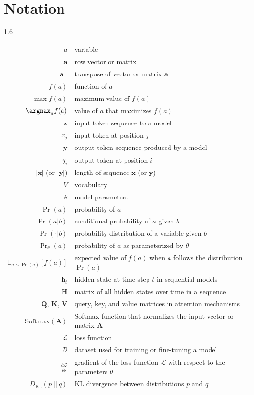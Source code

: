\chapter*{Notation}

\vspace{1.5em}

\begin{spacing}{1.6}
\begin{center}
\begin{tabular}{r l}
$a$ & variable \\
$\mathbf{a}$ & row vector or matrix \\
$\mathbf{a}^\top$ & transpose of vector or matrix $\mathbf{a}$ \\
$f(a)$ & function of $a$ \\
$\max f(a)$ & maximum value of $f(a)$ \\
$\argmax_{a} f(a)$ & value of $a$ that maximizes $f(a)$ \\
$\mathbf{x}$ & input token sequence to a model \\
$x_j$ & input token at position $j$ \\
$\mathbf{y}$ & output token sequence produced by a model \\
$y_i$ & output token at position $i$ \\
$|\mathbf{x}|$ (or $|\mathbf{y}|$) & length of sequence $\mathbf{x}$ (or $\mathbf{y}$)  \\
$V$ & vocabulary \\
$\theta$ & model parameters \\
$\Pr(a)$ & probability of $a$ \\
$\Pr(a|b)$ & conditional probability of $a$ given $b$ \\
$\Pr(\cdot|b)$ & probability distribution of a variable given $b$ \\
$\Pr_{\theta}(a)$ &  probability of $a$ as parameterized by $\theta$ \\
$\mathbb{E}_{a\sim \Pr(a)}[f(a)]$ & expected value of $f(a)$ when $a$ follows the distribution $\Pr(a)$ \\
$\mathbf{h}_t$ & hidden state at time step $t$ in sequential models \\
$\mathbf{H}$ & matrix of all hidden states over time in a sequence \\
$\mathbf{Q}$, $\mathbf{K}$, $\mathbf{V}$ & query, key, and value matrices in attention mechanisms \\
$\mathrm{Softmax}(\mathbf{A})$ & Softmax function that normalizes the input vector or matrix $\mathbf{A}$ \\
$\mathcal{L}$ & loss function \\
$\mathcal{D}$ & dataset used for training or fine-tuning a model \\
$\frac{\partial \mathcal{L}}{\partial \theta}$ & gradient of the loss function $\mathcal{L}$ with respect to the parameters $\theta$ \\
$D_{\mathrm{KL}}(p\ ||\ q)$ & KL divergence between distributions $p$ and $q$
\end{tabular}
\end{center}
\end{spacing}
